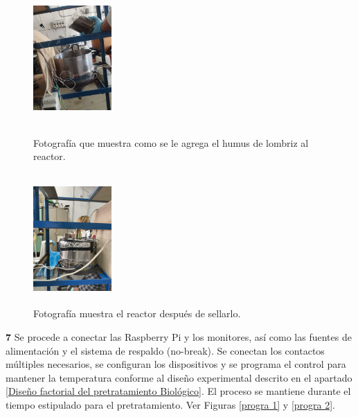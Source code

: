 \documentclass[12pt]{article}
\begin{document}
	\begin{figure}[H]
		\centering
		\begin{minipage}{0.46\textwidth}
			\centering
			\includegraphics[width=3cm, height=5cm]{imagenes/humus2} %
			\caption{Fotografía que muestra como se le agrega el humus de lombriz al reactor.}
				\label{humus2}
			\end{minipage}
			\hfill
			\begin{minipage}{0.48\textwidth}
				\centering
				\includegraphics[width=3cm, height=5cm]{imagenes/cellado del reactor} %
				\caption{Fotografía muestra el reactor después de sellarlo.}
				\label{cellado del reactor}
			\end{minipage}
		\end{figure}
		
			
			\textbf{7} Se procede a conectar las Raspberry Pi y los monitores, así como las fuentes de alimentación y el sistema de respaldo (no-break). Se conectan los contactos múltiples necesarios, se configuran los dispositivos y se programa el control para mantener la temperatura conforme al diseño experimental descrito en el apartado \ref{Diseño factorial del pretratamiento Biológico}. El proceso se mantiene durante el tiempo estipulado para el pretratamiento. Ver Figuras \ref{progra 1} y \ref{progra 2}.
			
\end{document}
